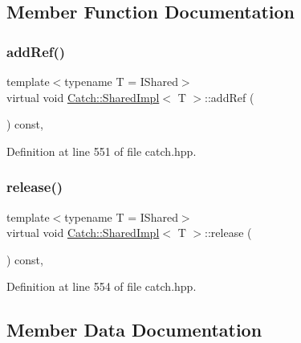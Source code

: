 \subsection{Member Function Documentation}
\hypertarget{struct_catch_1_1_shared_impl_a5d1a4c96e8fc07c821890fd09749062e}{}\label{struct_catch_1_1_shared_impl_a5d1a4c96e8fc07c821890fd09749062e} 
\subsubsection{\texorpdfstring{add\+Ref()}{addRef()}}
{\footnotesize\ttfamily template$<$typename T = I\+Shared$>$ \\
virtual void \hyperlink{struct_catch_1_1_shared_impl}{Catch\+::\+Shared\+Impl}$<$ T $>$\+::add\+Ref (\begin{DoxyParamCaption}{ }\end{DoxyParamCaption}) const\hspace{0.3cm}{\ttfamily [inline]}, {\ttfamily [virtual]}}



Definition at line 551 of file catch.\+hpp.

\hypertarget{struct_catch_1_1_shared_impl_ada8052c6f24fd73ec099333626f106fe}{}\label{struct_catch_1_1_shared_impl_ada8052c6f24fd73ec099333626f106fe} 
\subsubsection{\texorpdfstring{release()}{release()}}
{\footnotesize\ttfamily template$<$typename T = I\+Shared$>$ \\
virtual void \hyperlink{struct_catch_1_1_shared_impl}{Catch\+::\+Shared\+Impl}$<$ T $>$\+::release (\begin{DoxyParamCaption}{ }\end{DoxyParamCaption}) const\hspace{0.3cm}{\ttfamily [inline]}, {\ttfamily [virtual]}}



Definition at line 554 of file catch.\+hpp.



\subsection{Member Data Documentation}
\hypertarget{struct_catch_1_1_shared_impl_a7e71ef1985b85aa41a1632f932a96bcb}{}\label{struct_catch_1_1_shared_impl_a7e71ef1985b85aa41a1632f932a96bcb} 
